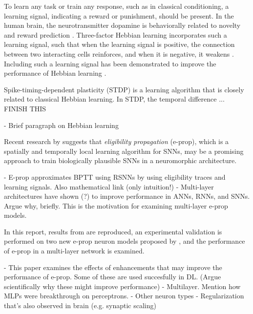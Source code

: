 To learn any task or train any response, such as in classical conditioning, a learning signal, indicating a reward or punishment, should be present.
In the human brain, the neurotransmitter dopamine is behaviorally related to novelty and reward prediction \citep{li2003dopamine,schultz2007behavioral}.
Three-factor Hebbian learning incorporates such a learning signal, such that when the learning signal is positive, the connection between two interacting cells reinforces, and when it is negative, it weakens \citep{fremaux2016neuromodulated}.
Including such a learning signal has been demonstrated to improve the performance of Hebbian learning \citep{porr2007learning}.

Spike-timing-dependent plasticity (STDP) is a learning algorithm that is closely related to classical Hebbian learning.
In STDP, the temporal difference ... FINISH THIS




\begin{tcolorbox}[colback=orange]
- Brief paragraph on Hebbian learning

\end{tcolorbox}



Recent research by \cite{bellec2020solution} suggests that \emph{eligibility propagation} (e-prop), which is a spatially and temporally local learning algorithm for SNNs, may be a promising approach to train biologically plausible SNNs in a neuromorphic architecture.
\begin{tcolorbox}[colback=orange]

- E-prop approximates BPTT using RSNNs by using eligibility traces and learning signals. Also mathematical link (only intuition!)
- Multi-layer architectures have shown (?) to improve performance in ANNs, RNNs, and SNNs. Argue why, briefly. This is the motivation for examining multi-layer e-prop models.

\end{tcolorbox}

In this report, results from \cite{bellec2020solution} are reproduced, an experimental validation is performed on two new e-prop neuron models proposed by \cite{traub2020learning}, and the performance of e-prop in a multi-layer network is examined.


\begin{tcolorbox}[colback=orange]

- This paper examines the effects of enhancements that may improve the performance of e-prop. Some of these are used succesfully in DL. (Argue scientifically why these might improve performance)
    - Multilayer. Mention how MLPs were breakthrough on perceptrons.
    - Other neuron types
    - Regularization that's also observed in brain (e.g. synaptic scaling)


\end{tcolorbox}
